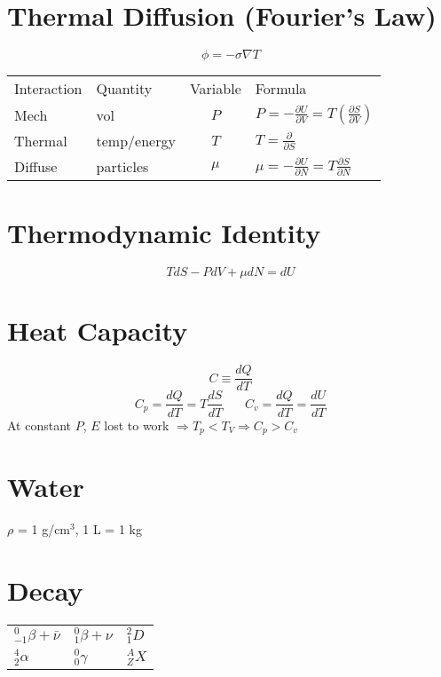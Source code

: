\documentclass[10pt,letter]{article}
\begin{document}
\section{Thermal Diffusion (Fourier's Law)} %
\label{sec:thermal_diffusion_}
\begin{equation}
    \phi = -\sigma \nabla T
\end{equation}

\begin{tabular}{l l c l}
Interaction & Quantity & Variable & Formula\\
Mech & vol & $P$ & $P = -\frac{\partial U}{\partial V}=T \left( \frac{\partial S}{\partial V} \right)$\\
Thermal & temp/energy & $T$ & $T = \frac{\partial }{\partial S}$\\
Diffuse & particles & $\mu$ & $\mu = -\frac{\partial U}{\partial N} = T \frac{\partial S}{\partial N}$
\end{tabular}

\section{Thermodynamic Identity} %
\label{sec:thermo_identity}
\begin{equation}
    T dS - PdV + \mu dN = dU
\end{equation}

\section{Heat Capacity} %
\label{sec:heat_capacity}
\begin{equation}
    C \equiv \frac{dQ}{dT}
\end{equation}
\begin{equation}
    C_p = \frac{dQ}{dT} = T \frac{dS}{dT}~~~~~~~~C_v = \frac{dQ}{dT} = \frac{dU}{dT}
\end{equation}
At constant $P$, $E$ lost to work $\Rightarrow T_p < T_V \Rightarrow C_p > C_v$

\section{Water} %
\label{sec:water}
$\rho$ = 1 g/cm$^3$, 1 L = 1 kg

\section{Decay} %
\label{sec:decay}
\begin{tabular}{ l l l}
$^0_{-1}\beta + \bar{\nu}$ & $^0_1 \beta + \nu$ & $^2_1 D$\\
$^4_2 \alpha$ & $^0_0 \gamma$ & $^A_Z X$
\end{tabular}
\end{document}
